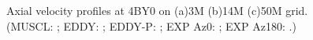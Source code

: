 \begin{figure}[t]
     \caption{Axial velocity profiles at 4BY0 on (a)3M (b)14M (c)50M grid. (MUSCL: \mline; EDDY: \eline; EDDY-P: \epline; EXP Az0: \bluediam; EXP Az180: \reddiam.)}
     \label{w}      
\end{figure}
